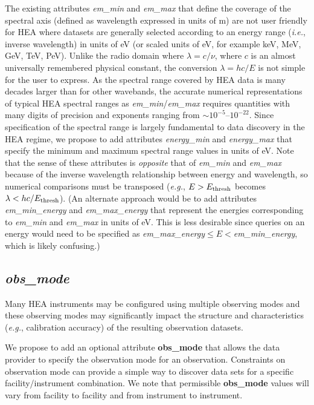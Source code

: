 \documentclass[11pt,a4paper]{ivoa}
\begin{document}
The existing attributes {\em em\_min\/} and {\em em\_max\/} that define the coverage of the spectral axis (defined as wavelength expressed in units of m) are not user friendly for \gls{HEA} where datasets are generally selected according to an energy range ({\em i.e.\/}, inverse wavelength) in units of eV (or scaled units of eV, for example keV, MeV, GeV, TeV, PeV). Unlike the radio domain where $\lambda = c/\nu$, where $c$ is an almost universally remembered physical constant, the conversion $\lambda = hc/E$ is not simple for the user to express. As the spectral range covered by \gls{HEA} data is many decades larger than for other wavebands, the accurate numerical representations of typical \gls{HEA} spectral ranges as {\em em\_min\/}/{\em em\_max\/} requires quantities with many digits of precision and exponents ranging from $\sim\!10^{-5}$--$10^{-22}$.  Since specification of the spectral range is largely fundamental to data discovery in the \gls{HEA} regime, we propose to add attributes {\em energy\_min\/} and {\em energy\_max\/} that specify the minimum and maximum spectral range values in units of eV\null. Note that the sense of these attributes is {\em opposite\/} that of {\em em\_min\/} and {\em em\_max\/} because of the inverse wavelength relationship between energy and wavelength, so numerical comparisons must be transposed ({\em e.g.\/}, $E>E_{\rm thresh}$ becomes $\lambda<hc/E_{\rm thresh}$).  (An alternate approach would be to add attributes {\em em\_min\_energy\/} and {\em em\_max\_energy\/} that represent the energies corresponding to {\em em\_min\/} and {\em em\_max\/} in units of eV\null. This is less desirable since queries on an energy would need to be specified as {\em em\_max\_energy\/}${}\leq E <{}${\em em\_min\_energy\/}, which is likely confusing.)


\subsection{{\em obs\_mode}}

Many \gls{HEA} instruments may be configured using multiple observing modes and these observing modes may significantly impact the structure and characteristics ({\em e.g.\/}, calibration accuracy) of the resulting observation datasets.

We propose to add an optional attribute {\bf obs\_mode} that allows the data provider to specify the observation mode for an observation.  Constraints on observation mode can provide a simple way to discover data sets for a specific facility/instrument combination.  We note that permissible {\bf obs\_mode} values will vary from facility to facility and from instrument to instrument.
\end{document}
